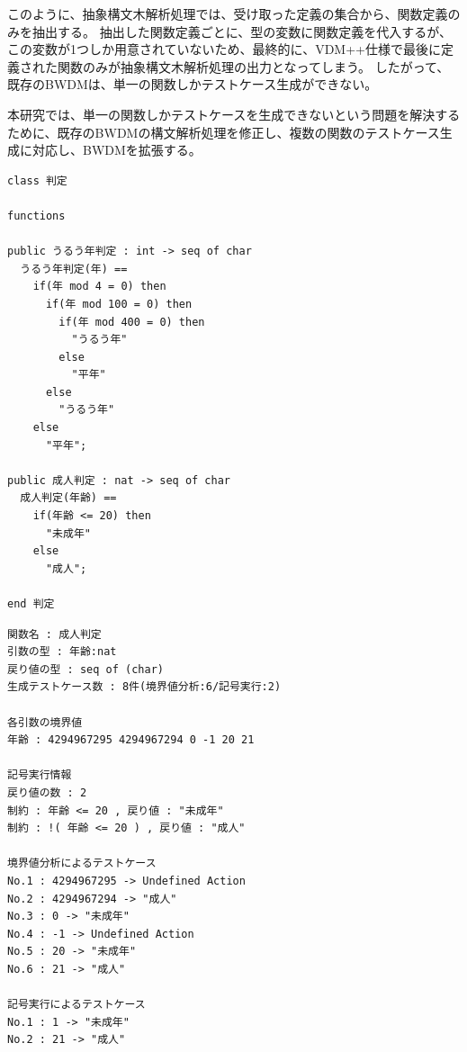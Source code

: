 \documentclass[uplatex, report, a4j, 10pt]{jsbook}
\newcommand{\tool}{BWDM}
\begin{document}
このように、抽象構文木解析処理では、受け取った定義の集合から、関数定義のみを抽出する。
抽出した関数定義ごとに、\TCExplicitFunctionDefinition{}型の変数に関数定義を代入するが、
この変数が1つしか用意されていないため、最終的に、VDM++仕様で最後に定義された関数のみが抽象構文木解析処理の出力となってしまう。
したがって、既存のBWDMは、単一の関数しかテストケース生成ができない。

本研究では、単一の関数しかテストケースを生成できないという問題を解決するために、既存の\tool{}の構文解析処理を修正し、複数の関数のテストケース生成に対応し、\tool{}を拡張する。

\lstset{language=}
\noindent\begin{minipage}{\textwidth}
  \begin{lstlisting}[caption=複数の関数を含むVDM++仕様,label=fig:func_multiple]
class 判定

functions

public うるう年判定 : int -> seq of char
  うるう年判定(年) ==
    if(年 mod 4 = 0) then
      if(年 mod 100 = 0) then
        if(年 mod 400 = 0) then
          "うるう年"
        else
          "平年"
      else
        "うるう年"
    else
      "平年";

public 成人判定 : nat -> seq of char
  成人判定(年齢) ==
    if(年齢 <= 20) then
      "未成年"
    else
      "成人";

end 判定
\end{lstlisting}
\end{minipage}

\lstset{language=}
\noindent\begin{minipage}{\textwidth}
  \begin{lstlisting}[caption=コード\ref{fig:func_multiple}のVDM++仕様を既存のBWDMに適用した際の出力,label=fig:func_multiple_result]
関数名 : 成人判定
引数の型 : 年齢:nat 
戻り値の型 : seq of (char)
生成テストケース数 : 8件(境界値分析:6/記号実行:2)

各引数の境界値
年齢 : 4294967295 4294967294 0 -1 20 21 

記号実行情報
戻り値の数 : 2
制約 : 年齢 <= 20 , 戻り値 : "未成年"
制約 : !( 年齢 <= 20 ) , 戻り値 : "成人"

境界値分析によるテストケース
No.1 : 4294967295 -> Undefined Action
No.2 : 4294967294 -> "成人"
No.3 : 0 -> "未成年"
No.4 : -1 -> Undefined Action
No.5 : 20 -> "未成年"
No.6 : 21 -> "成人"

記号実行によるテストケース
No.1 : 1 -> "未成年"
No.2 : 21 -> "成人"
\end{lstlisting}
\end{minipage}
\end{document}
